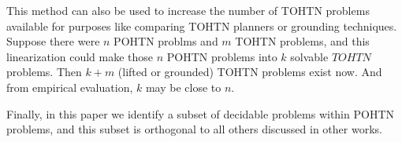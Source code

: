 \documentclass[letterpaper]{article} %
\begin{document}
This method can also be used to increase the number of TOHTN problems available for purposes like comparing TOHTN planners or grounding techniques. Suppose there were $n$ POHTN problms and $m$ TOHTN problems, and this linearization could make those $n$ POHTN problems into $k$ solvable $TOHTN$ problems. Then $k+m$ (lifted or grounded) TOHTN problems exist now. And from empirical evaluation, $k$ may be close to $n$.

Finally, in this paper we identify a subset of decidable problems within POHTN problems, and this subset is orthogonal to all others discussed in other works.










\end{document}
